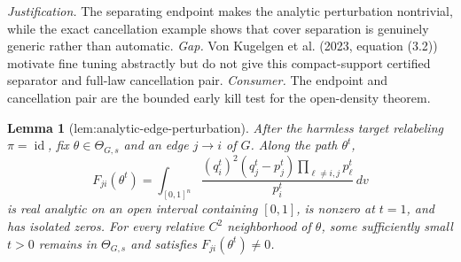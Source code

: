 \documentclass{article}
\newtheorem{lemma}{Lemma}
\begin{document}
\par\smallskip\noindent \textit{Justification.} The separating endpoint makes the analytic perturbation nontrivial, while the exact cancellation example shows that cover separation is genuinely generic rather than automatic. \textit{Gap.} Von Kugelgen et al. (2023, equation (3.2)) motivate fine tuning abstractly but do not give this compact-support certified separator and full-law cancellation pair. \textit{Consumer.} The endpoint and cancellation pair are the bounded early kill test for the open-density theorem.

\begin{lemma}[lem:analytic-edge-perturbation]\label{lem:analytic-edge-perturbation}
After the harmless target relabeling \(\pi=\operatorname{id}\), fix \(\theta\in\Theta_{G,s}\) and an edge \(j\to i\) of \(G\). Along the path \(\theta^t\), \[F_{ji}(\theta^t)=\int_{[0,1]^n}\frac{(q_i^t)^2(q_j^t-p_j^t)\prod_{\ell\ne i,j}p_\ell^t}{p_i^t}\,dv\] is real analytic on an open interval containing \([0,1]\), is nonzero at \(t=1\), and has isolated zeros. For every relative \(C^2\) neighborhood of \(\theta\), some sufficiently small \(t>0\) remains in \(\Theta_{G,s}\) and satisfies \(F_{ji}(\theta^t)\ne0\).
\end{lemma}
\end{document}
